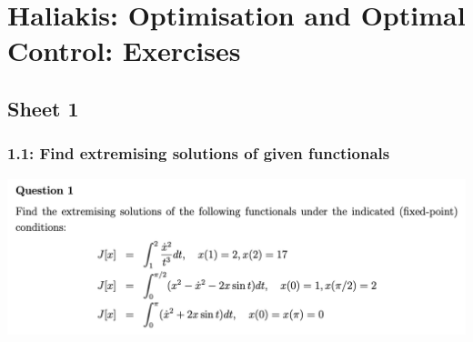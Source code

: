 
\section{Haliakis: Optimisation and Optimal Control: Exercises}
\subsection{Sheet 1}
\subsubsection{1.1: Find extremising solutions of given functionals}
\begin{mdframed}
  \includegraphics[width=400pt]{img/cov-haliakis-ooc-1-1.png}
\end{mdframed}

